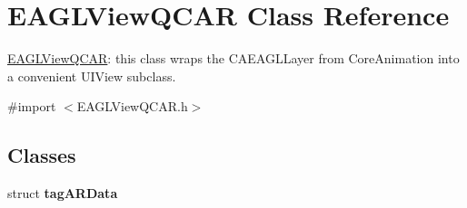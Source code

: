\hypertarget{interface_e_a_g_l_view_q_c_a_r}{
\section{\-E\-A\-G\-L\-View\-Q\-C\-A\-R \-Class \-Reference}
\label{interface_e_a_g_l_view_q_c_a_r}
}


\hyperlink{interface_e_a_g_l_view_q_c_a_r}{\-E\-A\-G\-L\-View\-Q\-C\-A\-R}\-: this class wraps the \-C\-A\-E\-A\-G\-L\-Layer from \-Core\-Animation into a convenient \-U\-I\-View subclass.  




{\ttfamily \#import $<$\-E\-A\-G\-L\-View\-Q\-C\-A\-R.\-h$>$}

\subsection*{\-Classes}
\begin{DoxyCompactItemize}
\item 
struct {\bfseries tag\-A\-R\-Data}
\end{DoxyCompactItemize}
